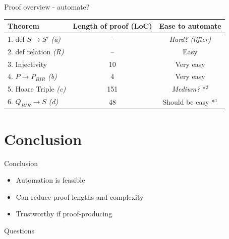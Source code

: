 \documentclass[xcolor={x11names}]{beamer}
\begin{document}
\begin{frame}{Proof overview - automate?}
    \begin{table}[]
        \begin{tabular}{|l|c|c|}
        \hline
        Theorem & Length of proof (LoC) & Ease to automate \\
        \hline
        \hline
        1. def $S \rightarrow S'$ \textit{\small (a)} & -- & \textit{Hard?} \textit{(lifter)} \\ \hline
        2. def relation \textit{\small (R)} & -- & Easy \\ \hline
        3. Injectivity & 10 & Very easy \\ \hline
        4. $P \rightarrow P_{BIR}$ \textit{\small (b)} & 4 & Very easy \\ \hline
        5. Hoare Triple \textit{\small (c)} & 151 & \textit{Medium?} *$^{2}$ \\ \hline
        6. $Q_{BIR} \rightarrow S$ \textit{\small (d)} & 48 & Should be easy *$^{1}$ \\ \hline
        \end{tabular}
    \end{table}


\end{frame}


\section{Conclusion}

\begin{frame}{Conclusion}
    \begin{itemize}
        \item Automation is feasible
        \item Can reduce proof lengths and complexity
        \item Trustworthy if proof-producing
    \end{itemize}
\end{frame}

\begin{frame}
    \begin{center}
        \huge
        Questions
    \end{center}
\end{frame}
\end{document}
